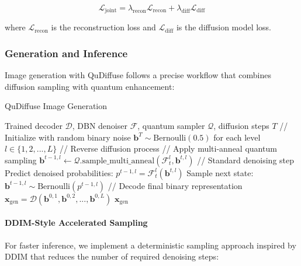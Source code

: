 \documentclass[10pt,twocolumn,letterpaper]{article}
\newcommand{\bm}[1]{\boldsymbol{#1}}
\newcommand{\binary}{\bm{b}}
\newcommand{\decoder}{\mathcal{D}}
\newcommand{\denoiser}{\mathcal{F}}
\newcommand{\img}{\bm{x}}
\newcommand{\sampling}{\mathcal{Q}}
\newcommand{\Bernoulli}{\text{Bernoulli}}
\begin{document}
\begin{equation}
\mathcal{L}_{\text{joint}} = \lambda_{\text{recon}} \mathcal{L}_{\text{recon}} + \lambda_{\text{diff}} \mathcal{L}_{\text{diff}}
\end{equation}

where $\mathcal{L}_{\text{recon}}$ is the reconstruction loss and $\mathcal{L}_{\text{diff}}$ is the diffusion model loss.

\subsubsection{Generation and Inference}

Image generation with QuDiffuse follows a precise workflow that combines diffusion sampling with quantum enhancement:

\begin{algorithm}
\caption{QuDiffuse Image Generation}
\label{alg:inference}
\begin{algorithmic}[1]
\REQUIRE Trained decoder $\decoder$, DBN denoiser $\denoiser$, quantum sampler $\sampling$, diffusion steps $T$
\STATE // Initialize with random binary noise
\STATE $\binary^T \sim \Bernoulli(0.5)$ for each level $l \in \{1,2,...,L\}$
\STATE // Reverse diffusion process
            \STATE // Apply multi-anneal quantum sampling
            \STATE $\binary^{t-1,l} \gets \sampling.\text{sample\_multi\_anneal}(\denoiser^l_t, \binary^{t,l})$
        \ENDFOR
    \ELSE
            \STATE // Standard denoising step
            \STATE Predict denoised probabilities: $p^{t-1,l} = \denoiser^l_t(\binary^{t,l})$
            \STATE Sample next state: $\binary^{t-1,l} \sim \Bernoulli(p^{t-1,l})$
        \ENDFOR
    \ENDIF
\ENDFOR
\STATE // Decode final binary representation
\STATE $\img_{\text{gen}} = \decoder(\binary^{0,1}, \binary^{0,2}, ..., \binary^{0,L})$
\RETURN $\img_{\text{gen}}$
\end{algorithmic}
\end{algorithm}

\paragraph{DDIM-Style Accelerated Sampling}
For faster inference, we implement a deterministic sampling approach inspired by DDIM that reduces the number of required denoising steps:
\end{document}
